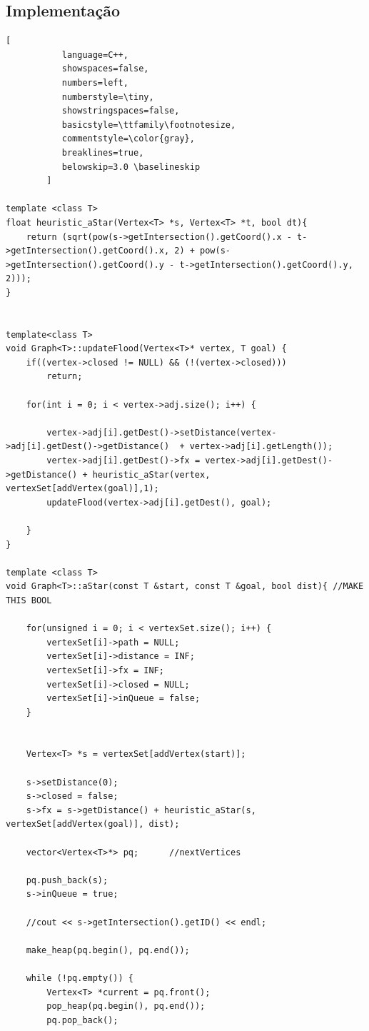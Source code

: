 \documentclass[a4paper]{article}
\begin{document}
\subsection{Implementação}

\begin{lstlisting}[
           language=C++,
           showspaces=false,
           numbers=left,
           numberstyle=\tiny,
           showstringspaces=false,
           basicstyle=\ttfamily\footnotesize,
           commentstyle=\color{gray},
           breaklines=true,
           belowskip=3.0 \baselineskip
        ]
        
template <class T>
float heuristic_aStar(Vertex<T> *s, Vertex<T> *t, bool dt){
	return (sqrt(pow(s->getIntersection().getCoord().x - t->getIntersection().getCoord().x, 2) + pow(s->getIntersection().getCoord().y - t->getIntersection().getCoord().y, 2)));
}


template<class T>
void Graph<T>::updateFlood(Vertex<T>* vertex, T goal) {
	if((vertex->closed != NULL) && (!(vertex->closed)))
		return;

	for(int i = 0; i < vertex->adj.size(); i++) {

		vertex->adj[i].getDest()->setDistance(vertex->adj[i].getDest()->getDistance()  + vertex->adj[i].getLength());
		vertex->adj[i].getDest()->fx = vertex->adj[i].getDest()->getDistance() + heuristic_aStar(vertex, vertexSet[addVertex(goal)],1);
		updateFlood(vertex->adj[i].getDest(), goal);

	}
}

template <class T>
void Graph<T>::aStar(const T &start, const T &goal, bool dist){ //MAKE THIS BOOL

	for(unsigned i = 0; i < vertexSet.size(); i++) {
		vertexSet[i]->path = NULL;
		vertexSet[i]->distance = INF;
		vertexSet[i]->fx = INF;
		vertexSet[i]->closed = NULL;
		vertexSet[i]->inQueue = false;
	}


	Vertex<T> *s = vertexSet[addVertex(start)];

	s->setDistance(0);
	s->closed = false;
	s->fx = s->getDistance() + heuristic_aStar(s, vertexSet[addVertex(goal)], dist);

	vector<Vertex<T>*> pq;		//nextVertices

	pq.push_back(s);
	s->inQueue = true;

	//cout << s->getIntersection().getID() << endl;

	make_heap(pq.begin(), pq.end());

	while (!pq.empty()) {
		Vertex<T> *current = pq.front();
		pop_heap(pq.begin(), pq.end());
		pq.pop_back();



\end{lstlisting}
\end{document}
